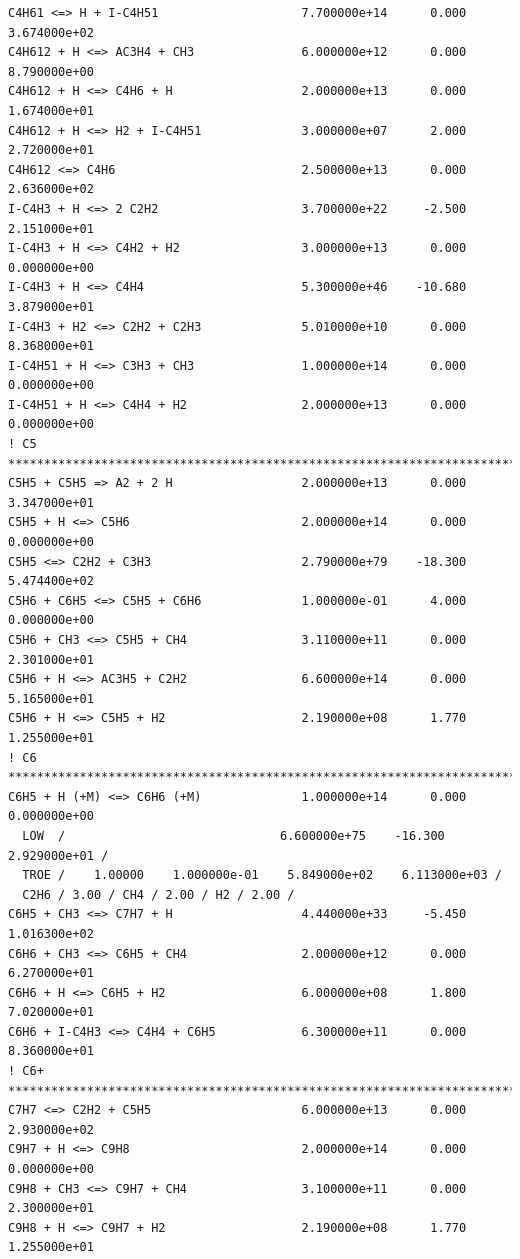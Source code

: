 \begin{verbatim}
C4H61 <=> H + I-C4H51                    7.700000e+14      0.000    3.674000e+02
C4H612 + H <=> AC3H4 + CH3               6.000000e+12      0.000    8.790000e+00
C4H612 + H <=> C4H6 + H                  2.000000e+13      0.000    1.674000e+01
C4H612 + H <=> H2 + I-C4H51              3.000000e+07      2.000    2.720000e+01
C4H612 <=> C4H6                          2.500000e+13      0.000    2.636000e+02
I-C4H3 + H <=> 2 C2H2                    3.700000e+22     -2.500    2.151000e+01
I-C4H3 + H <=> C4H2 + H2                 3.000000e+13      0.000    0.000000e+00
I-C4H3 + H <=> C4H4                      5.300000e+46    -10.680    3.879000e+01
I-C4H3 + H2 <=> C2H2 + C2H3              5.010000e+10      0.000    8.368000e+01
I-C4H51 + H <=> C3H3 + CH3               1.000000e+14      0.000    0.000000e+00
I-C4H51 + H <=> C4H4 + H2                2.000000e+13      0.000    0.000000e+00
! C5 ***************************************************************************
C5H5 + C5H5 => A2 + 2 H                  2.000000e+13      0.000    3.347000e+01
C5H5 + H <=> C5H6                        2.000000e+14      0.000    0.000000e+00
C5H5 <=> C2H2 + C3H3                     2.790000e+79    -18.300    5.474400e+02
C5H6 + C6H5 <=> C5H5 + C6H6              1.000000e-01      4.000    0.000000e+00
C5H6 + CH3 <=> C5H5 + CH4                3.110000e+11      0.000    2.301000e+01
C5H6 + H <=> AC3H5 + C2H2                6.600000e+14      0.000    5.165000e+01
C5H6 + H <=> C5H5 + H2                   2.190000e+08      1.770    1.255000e+01
! C6 ***************************************************************************
C6H5 + H (+M) <=> C6H6 (+M)              1.000000e+14      0.000    0.000000e+00
  LOW  /                              6.600000e+75    -16.300    2.929000e+01 /
  TROE /    1.00000    1.000000e-01    5.849000e+02    6.113000e+03 /
  C2H6 / 3.00 / CH4 / 2.00 / H2 / 2.00 /
C6H5 + CH3 <=> C7H7 + H                  4.440000e+33     -5.450    1.016300e+02
C6H6 + CH3 <=> C6H5 + CH4                2.000000e+12      0.000    6.270000e+01
C6H6 + H <=> C6H5 + H2                   6.000000e+08      1.800    7.020000e+01
C6H6 + I-C4H3 <=> C4H4 + C6H5            6.300000e+11      0.000    8.360000e+01
! C6+ **************************************************************************
C7H7 <=> C2H2 + C5H5                     6.000000e+13      0.000    2.930000e+02
C9H7 + H <=> C9H8                        2.000000e+14      0.000    0.000000e+00
C9H8 + CH3 <=> C9H7 + CH4                3.100000e+11      0.000    2.300000e+01
C9H8 + H <=> C9H7 + H2                   2.190000e+08      1.770    1.255000e+01

\end{verbatim}
